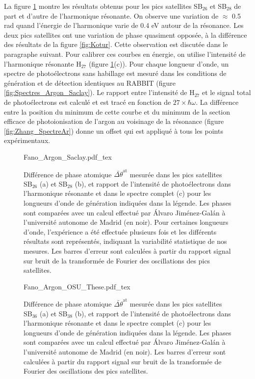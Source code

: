 La figure \ref{fig:Phases_Argon_Saclay} montre les résultats obtenus pour les pics satellites SB$_{26}$ et SB$_{28}$ de part et d'autre de l'harmonique résonante. On observe une variation de $\approx$ 0.5 rad quand l'énergie de l'harmonique varie de 0.4 eV autour de la résonance. Les deux pics satellites ont une variation de phase quasiment opposée, à la différence des résultats de la figure \ref{fig:Kotur}. Cette observation est discutée dans le paragraphe suivant. Pour calibrer ces courbes en énergie, on utilise l'intensité de l'harmonique résonante H$_{27}$ (figure \ref{fig:Phases_Argon_Saclay}(c)). Pour chaque longueur d'onde, un spectre de photoélectrons sans habillage est mesuré dans les conditions de génération et de détection identiques au RABBIT (figure \ref{fig:Spectres_Argon_Saclay}). Le rapport entre l'intensité de H$_{27}$ et le signal total de photoélectrons est calculé et est tracé en fonction de $27 \times \hbar \omega$. La différence entre la position du minimum de cette courbe et du minimum de la section efficace de photoionisation de l'argon au voisinage de la résonance (figure \ref{fig:Zhang_SpectreAr}) donne un offset qui est appliqué à tous les points expérimentaux.

\begin{figure}[ht]
\centering
\def\svgwidth{1\textwidth}
{Fano_Argon_Saclay.pdf_tex}
\caption{Différence de phase atomique $\bar{\Delta \theta}^{\text{at}}$ mesurée dans les pics satellites SB$_{26}$ (a) et SB$_{28}$ (b), et rapport de l'intensité de photoélectrons dans l'harmonique résonante et dans le spectre complet (c) pour les longueurs d'onde de génération indiquées dans la légende. Les phases sont comparées avec un calcul effectué par \'{A}lvaro Jiménez-Gal\'{a}n à l'université autonome de Madrid (en noir). Pour certaines longueurs d'onde, l'expérience a été effectuée plusieurs fois et les différents résultats sont représentés, indiquant la variabilité statistique de nos mesures. Les barres d'erreur sont calculées à partir du rapport signal sur bruit de la transformée de Fourier des oscillations des pics satellites.}
\label{fig:Phases_Argon_Saclay}
\end{figure}

\begin{figure}[ht]
\centering
\def\svgwidth{1\textwidth}
{Fano_Argon_OSU_These.pdf_tex}
\caption{Différence de phase atomique $\bar{\Delta \theta}^{\text{at}}$ mesurée dans les pics satellites SB$_{36}$ (a) et SB$_{38}$ (b), et rapport de l'intensité de photoélectrons dans l'harmonique résonante et dans le spectre complet (c) pour les longueurs d'onde de génération indiquées dans la légende. Les phases sont comparées avec un calcul effectué par \'{A}lvaro Jiménez-Gal\'{a}n à l'université autonome de Madrid (en noir). Les barres d'erreur sont calculées à partir du rapport signal sur bruit de la transformée de Fourier des oscillations des pics satellites.}
\label{fig:Phases_Argon_OSU}
\end{figure}

